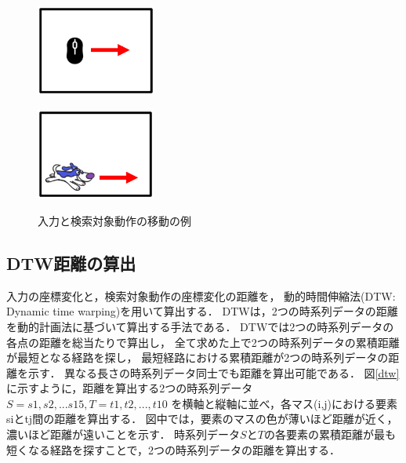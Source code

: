 \documentclass[11pt]{jreport}
\begin{document}
\begin{figure}[H]
    \centering
    \begin{minipage}{0.45\linewidth}
        \centering
        \includegraphics[height=3cm]{catmove.eps}
        \label{catmove}
    \end{minipage}
    \hspace{0.04\columnwidth}
    \begin{minipage}{0.45\linewidth}
        \centering
        \includegraphics[height=3cm]{dogmove.eps}
        \label{dogmove}
    \end{minipage}
    \hspace{0.04\columnwidth}
    \caption{入力と検索対象動作の移動の例}
    \label{moveexample}
\end{figure}

\subsection{DTW距離の算出}
入力の座標変化と，検索対象動作の座標変化の距離を，
動的時間伸縮法(DTW: Dynamic time warping)を用いて算出する．
DTWは，2つの時系列データの距離を動的計画法に基づいて算出する手法である．
DTWでは2つの時系列データの各点の距離を総当たりで算出し，
全て求めた上で2つの時系列データの累積距離が最短となる経路を探し，
最短経路における累積距離が2つの時系列データの距離を示す．
異なる長さの時系列データ同士でも距離を算出可能である．
図\ref{dtw}に示すように，距離を算出する2つの時系列データ$S=s1,s2,...s15,T=t1,t2,...,t10$
を横軸と縦軸に並べ，各マス(i,j)における要素siとtj間の距離を算出する．
図中では，要素のマスの色が薄いほど距離が近く，濃いほど距離が遠いことを示す．
時系列データ$S$と$T$の各要素の累積距離が最も短くなる経路を探すことで，2つの時系列データの距離を算出する．
\end{document}
